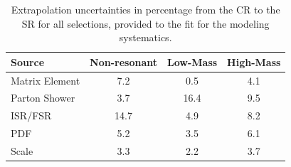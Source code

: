 \begin{table}
\centering
\begin{tabular}{l|ccc}
\hline
Source               & Non-resonant 	&  Low-Mass   		& 		High-Mass   \\\hline\hline 
Matrix Element       & 7.2 			&    0.5                	 &           	4.1                 \\\hline
Parton Shower        & 3.7 			&   16.4                     &              9.5                 \\\hline
ISR/FSR              & 14.7 			&  4.9       			 &             8.2                 \\\hline
PDF                  & 5.2 			&  3.5 			&           6.1                 \\\hline
Scale                & 3.3 			& 2.2                		&               3.7                 \\\hline\hline

\end{tabular}
\caption[Extrapolation uncertainties]{Extrapolation uncertainties in percentage from the CR to the SR for all selections,  provided to the fit for the \ttbar modeling systematics.}
\label{tab:ttbarModeling}
\end{table}

